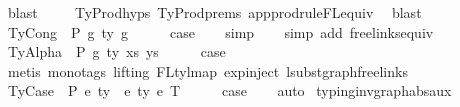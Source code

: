 \begin{isabellebody}
\ blast\isanewline
\ \ \ \isamarkupfalse%
\ TyProd{\isachardot}{\kern0pt}hyps{\isacharparenleft}{\kern0pt}{}{\isacharparenright}{\kern0pt}\ TyProd{\isachardot}{\kern0pt}prems\ app{\isacharunderscore}{\kern0pt}prodrule{\isacharunderscore}{\kern0pt}FL{\isacharunderscore}{\kern0pt}equiv\ \isamarkupfalse%
\ blast\isanewline
{}\isamarkupfalse%
\isanewline
\ \ \isamarkupfalse%
\ {\isacharparenleft}{\kern0pt}TyCong\ {\isasymGamma}\ P\ g{}\ ty\ g{}{\isacharparenright}{\kern0pt}\isanewline
\ \ \isamarkupfalse%
\ \isamarkupfalse%
\ {\isacharquery}{\kern0pt}case\isanewline
\ \ \isamarkupfalse%
\ simp\isanewline
\ \ \isamarkupfalse%
\ {\isacharparenleft}{\kern0pt}simp\ add{\isacharcolon}{\kern0pt}\ freelinks{\isacharunderscore}{\kern0pt}equiv{\isacharparenright}{\kern0pt}\isanewline
{}\isamarkupfalse%
\isanewline
\ \ \isamarkupfalse%
\ {\isacharparenleft}{\kern0pt}TyAlpha\ {\isasymGamma}{}\ P\ g\ ty\ xs\ ys{\isacharparenright}{\kern0pt}\isanewline
\ \ \isamarkupfalse%
\ \isamarkupfalse%
\ {\isacharquery}{\kern0pt}case\isanewline
\ \ \isamarkupfalse%
\ {\isacharparenleft}{\kern0pt}metis\ {\isacharparenleft}{\kern0pt}mono{\isacharunderscore}{\kern0pt}tags{\isacharcomma}{\kern0pt}\ lifting{\isacharparenright}{\kern0pt}\ FL{\isacharunderscore}{\kern0pt}ty{\isacharunderscore}{\kern0pt}lmap\ exp{\isachardot}{\kern0pt}inject{\isacharparenleft}{\kern0pt}{}{\isacharparenright}{\kern0pt}\ lsubst{\isacharunderscore}{\kern0pt}graph{\isacharunderscore}{\kern0pt}freelinks{\isacharparenright}{\kern0pt}\isanewline
{}\isamarkupfalse%
\isanewline
\ \ \isamarkupfalse%
\ {\isacharparenleft}{\kern0pt}TyCase\ {\isasymGamma}\ P\ e{}\ ty{}\ {\isasymGamma}{}\ e{}\ ty{}\ e{}\ T{\isacharparenright}{\kern0pt}\isanewline
\ \ \isamarkupfalse%
\ \isamarkupfalse%
\ {\isacharquery}{\kern0pt}case\isanewline
\ \ \isamarkupfalse%
\ auto\isanewline
{}\isamarkupfalse%
%
\endisatagproof
{\isafoldproof}%
%
\isadelimproof
\isanewline
%
\endisadelimproof
\isanewline
\isanewline
{}\isamarkupfalse%
\ typing{\isacharunderscore}{\kern0pt}inv{\isacharunderscore}{\kern0pt}graph{\isacharunderscore}{\kern0pt}abs{\isacharunderscore}{\kern0pt}aux{\isacharcolon}{\kern0pt}\isanewline

\end{isabellebody}
